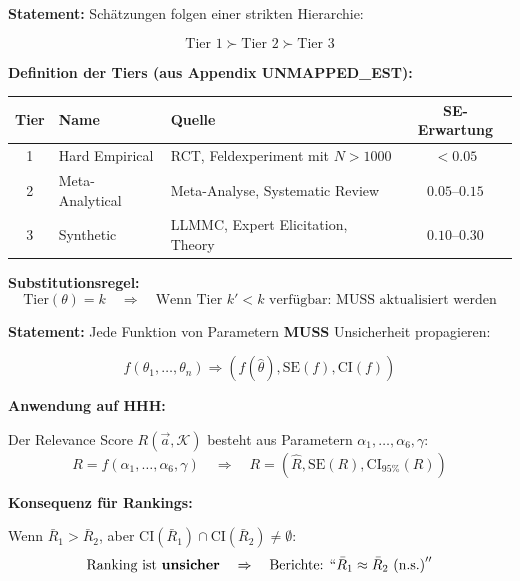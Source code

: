 \begin{tcolorbox}[colback=gray!5!white, colframe=gray!75!black,
    title=\textbf{Axiom EI-2: Tier Hierarchy}]

\textbf{Statement:} Schätzungen folgen einer strikten Hierarchie:

\begin{equation}
\boxed{\text{Tier 1} \succ \text{Tier 2} \succ \text{Tier 3}}
\end{equation}

\textbf{Definition der Tiers (aus Appendix UNMAPPED_EST):}

\renewcommand{\arraystretch}{1.3}
\begin{center}
\begin{tabular}{@{}clp{6cm}c@{}}
\toprule
\textbf{Tier} & \textbf{Name} & \textbf{Quelle} & \textbf{SE-Erwartung} \\
\midrule
1 & Hard Empirical & RCT, Feldexperiment mit $N > 1000$ & $< 0.05$ \\
2 & Meta-Analytical & Meta-Analyse, Systematic Review & $0.05$--$0.15$ \\
3 & Synthetic & LLMMC, Expert Elicitation, Theory & $0.10$--$0.30$ \\
\bottomrule
\end{tabular}
\end{center}

\textbf{Substitutionsregel:}
\begin{equation}
\text{Tier}(\theta) = k \quad \Rightarrow \quad \text{Wenn Tier } k' < k \text{ verfügbar: } \text{MUSS aktualisiert werden}
\end{equation}

\end{tcolorbox}

\begin{tcolorbox}[colback=gray!5!white, colframe=gray!75!black,
    title=\textbf{Axiom EI-3: Uncertainty Propagation Requirement}]

\textbf{Statement:} Jede Funktion von Parametern \textbf{MUSS} Unsicherheit propagieren:

\begin{equation}
\boxed{f(\theta_1, \ldots, \theta_n) \Rightarrow (f(\hat{\theta}), \text{SE}(f), \text{CI}(f))}
\end{equation}

\textbf{Anwendung auf HHH:}

Der Relevance Score $R(\vec{a}, \mathcal{K})$ besteht aus Parametern $\alpha_1, \ldots, \alpha_6, \gamma$:
\begin{equation}
R = f(\alpha_1, \ldots, \alpha_6, \gamma) \quad \Rightarrow \quad R = (\hat{R}, \text{SE}(R), \text{CI}_{95\%}(R))
\end{equation}

\textbf{Konsequenz für Rankings:}

Wenn $\bar{R}_1 > \bar{R}_2$, aber $\text{CI}(\bar{R}_1) \cap \text{CI}(\bar{R}_2) \neq \emptyset$:
\begin{equation}
\text{Ranking ist } \textbf{unsicher} \quad \Rightarrow \quad \text{Berichte: } ``\bar{R}_1 \approx \bar{R}_2 \text{ (n.s.)}''
\end{equation}

\end{tcolorbox}

